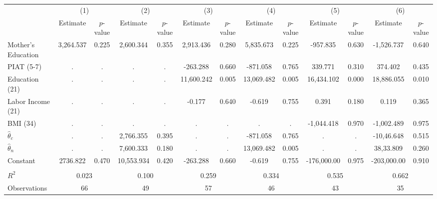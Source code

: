 \begin{tabular}{lcccccccccccc} \toprule
 & \multicolumn{2}{c}{(1)}  &  \multicolumn{2}{c}{(2)}  &  \multicolumn{2}{c}{(3)}  &  \multicolumn{2}{c}{(4)}  & \multicolumn{2}{c}{(5)} & \multicolumn{2}{c}{(6)} \\  
 & Estimate & $p$-value & Estimate & $p$-value & Estimate & $p$-value & Estimate & $p$-value & Estimate & $p$-value & Estimate & $p$-value \\ \midrule
Mother's Education &  3,264.537 &     0.225 &  2,600.344 &     0.355 &  2,913.436 &     0.280 &  5,835.673 &     0.225 &  -957.835 &     0.630 & -1,526.737 &     0.640 \\  
PIAT (5-7) &         . &         . &         . &         . &  -263.288 &     0.660 &  -871.058 &     0.765 &   339.771 &     0.310 &   374.402 &     0.435 \\  
Education (21) &         . &         . &         . &         . & 11,600.242 &     0.005 & 13,069.482 &     0.005 & 16,434.102 &     0.000 & 18,886.055 &     0.010 \\  
Labor Income (21) &         . &         . &         . &         . &    -0.177 &     0.640 &    -0.619 &     0.755 &     0.391 &     0.180 &     0.119 &     0.365 \\  
BMI (34) &         . &         . &         . &         . &         . &         . &         . &         . & -1,044.418 &     0.970 & -1,002.489 &     0.975 \\  
$\hat{\theta}_{c}$ &         . &         . &  2,766.355 &     0.395 &         . &         . &  -871.058 &     0.765 &         . &         . & -10,46.648 &     0.515 \\  
$\hat{\theta}_{n}$  &         . &         . &  7,600.333 &     0.180 &         . &         . & 13,069.482 &     0.005 &         . &         . &  38,33.809 &     0.260 \\  
Constant &  2736.822 &     0.470 & 10,553.934 &     0.420 &  -263.288 &     0.660 &    -0.619 &     0.755 & -176,000.00 &     0.975 & -203,000.00 &     0.910 \\  \\ \midrule 
$R^2$ &     \multicolumn{2}{c}{0.023} &     \multicolumn{2}{c}{0.100} &     \multicolumn{2}{c}{0.259}  &     \multicolumn{2}{c}{0.334}  &     \multicolumn{2}{c}{0.535} &     \multicolumn{2}{c}{0.662}  \\  
Observations &    \multicolumn{2}{c}{66}  &    \multicolumn{2}{c}{49}  &    \multicolumn{2}{c}{57} &    \multicolumn{2}{c}{46} &    \multicolumn{2}{c}{43}  &    \multicolumn{2}{c}{35} \\ \bottomrule \end{tabular}
